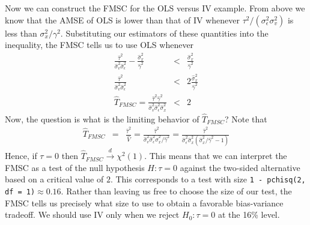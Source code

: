 \documentclass[12pt]{article}
\theoremstyle{definition}
\begin{document}
Now we can construct the FMSC for the OLS versus IV example. From above we know that the AMSE of OLS is lower than that of IV whenever $\tau^2/(\sigma_\epsilon^2 \sigma_v^2)$ is less than $\sigma_x^2/\gamma^2$. Substituting our estimators of these quantities into the inequality, the FMSC tells us to use OLS whenever
  \begin{eqnarray*}
       \frac{\widehat{\tau}^2}{\widehat{\sigma}_v^2 \widehat{\sigma}_\epsilon^2} - \frac{\widehat{\sigma}_x^2}{\widehat{\gamma}^2} &<& \frac{\widehat{\sigma}_x^2}{\widehat{\gamma}^2}\\
       \frac{\widehat{\tau}^2}{\widehat{\sigma}_v^2 \widehat{\sigma}_\epsilon^2} &<& 2 \frac{\widehat{\sigma}_x^2}{\widehat{\gamma}^2} \\
        \widehat{T}_{FMSC} = \frac{\widehat{\tau}^2 \widehat{\gamma}^2}{\widehat{\sigma}_v^2 \widehat{\sigma}_\epsilon^2 \widehat{\sigma}_x^2} &<& 2
  \end{eqnarray*}
Now, the question is what is the limiting behavior of $\widehat{T}_{FMSC}$? Note that
  \begin{eqnarray*}
    \widehat{T}_{FMSC} &=& \frac{\widehat{\tau}^2}{\widehat{V}} = \frac{\widehat{\tau}^2 }{\widehat{\sigma}_v^2 \widehat{\sigma}_\epsilon^2 \widehat{\sigma}_x^2/\widehat{\gamma}^2} = \frac{\widehat{\tau}^2}{ \widehat{\sigma}^2_\epsilon \widehat{\sigma}^2_x \left(\widehat{\sigma}_x^2/\widehat{\gamma}^2 - 1 \right)}
  \end{eqnarray*}
Hence, if $\tau = 0$ then $\widehat{T}_{FMSC} \overset{d}{\rightarrow} \chi^2(1)$. This means that we can interpret the FMSC as a test of the null hypothesis $H\colon \tau = 0$ against the two-sided alternative based on a critical value of $2$. This corresponds to a test with size  \texttt{1 - pchisq(2, df = 1)}$\approx 0.16$. Rather than leaving us free to choose the size of our test, the FMSC tells us precisely what size to use to obtain a favorable bias-variance tradeoff. We should use IV only when we reject $H_0\colon \tau = 0$ at the 16\% level. 
\end{document}
